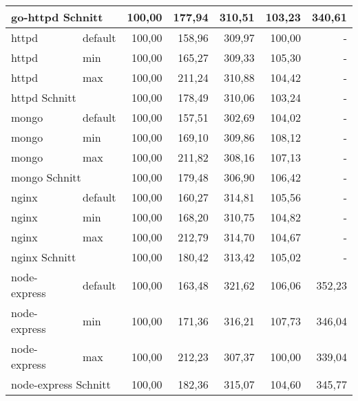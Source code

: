 \begin{footnotesize}
\begin{longtable}{llrrrrr}
		\multicolumn{2}{l}{go-httpd Schnitt}       & 100,00 & 177,94 & 310,51  & 103,23                         & 340,61 \\ \hline
		httpd                    & default         & 100,00 & 158,96 & 309,97  & \cellcolor[HTML]{C0C0C0}100,00 & -      \\
		httpd                    & min             & 100,00 & 165,27 & 309,33  & 105,30                         & -      \\
		httpd                    & max             & 100,00 & 211,24 & 310,88  & 104,42                         & -      \\ \hline
		\multicolumn{2}{l}{httpd Schnitt}          & 100,00 & 178,49 & 310,06  & 103,24                         & -      \\ \hline
		mongo                    & default         & 100,00 & 157,51 & 302,69  & 104,02                         & -      \\
		mongo                    & min             & 100,00 & 169,10 & 309,86  & 108,12                         & -      \\
		mongo                    & max             & 100,00 & 211,82 & 308,16  & 107,13                         & -      \\ \hline
		\multicolumn{2}{l}{mongo Schnitt}          & 100,00 & 179,48 & 306,90  & 106,42                         & -      \\ \hline
		nginx                    & default         & 100,00 & 160,27 & 314,81  & 105,56                         & -      \\
		nginx                    & min             & 100,00 & 168,20 & 310,75  & 104,82                         & -      \\
		nginx                    & max             & 100,00 & 212,79 & 314,70  & 104,67                         & -      \\ \hline
		\multicolumn{2}{l}{nginx Schnitt}          & 100,00 & 180,42 & 313,42  & 105,02                         & -      \\ \hline
		node-express             & default         & 100,00 & 163,48 & 321,62  & 106,06                         & 352,23 \\
		node-express             & min             & 100,00 & 171,36 & 316,21  & 107,73                         & 346,04 \\
		node-express             & max             & 100,00 & 212,23 & 307,37  & \cellcolor[HTML]{C0C0C0}100,00 & 339,04 \\ \hline
		\multicolumn{2}{l}{node-express Schnitt}   & 100,00 & 182,36 & 315,07  & 104,60                         & 345,77 \\ \hline

\end{longtable}
\end{footnotesize}
